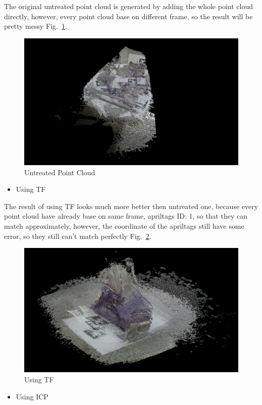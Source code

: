\documentclass[letterpaper, 10 pt, conference]{ieeeconf}  %
\begin{document}
The original untreated point cloud is generated by adding the whole point cloud directly, however, every point cloud base on different frame, so the result will be pretty messy Fig.~\ref{figure:untreated}.

\begin{figure}[h] %
\includegraphics[width=0.8\columnwidth]{add}
\centering
\caption{Untreated Point Cloud}
\label{figure:untreated}
\end{figure}

\begin{itemize}
\item Using TF
\end{itemize}

The result of using TF looks much more better then untreated one, because every point cloud have already base on same frame, apriltags ID: 1, so that they can match approximately, however, the coordinate of the apriltags still have some error, so they still can't match perfectly Fig.~\ref{figure:TF}.

\begin{figure}[h] %
\includegraphics[width=0.8\columnwidth]{tf}
\centering
\caption{Using TF}
\label{figure:TF}
\end{figure}

\begin{itemize}
\item Using ICP
\end{itemize}
\end{document}
